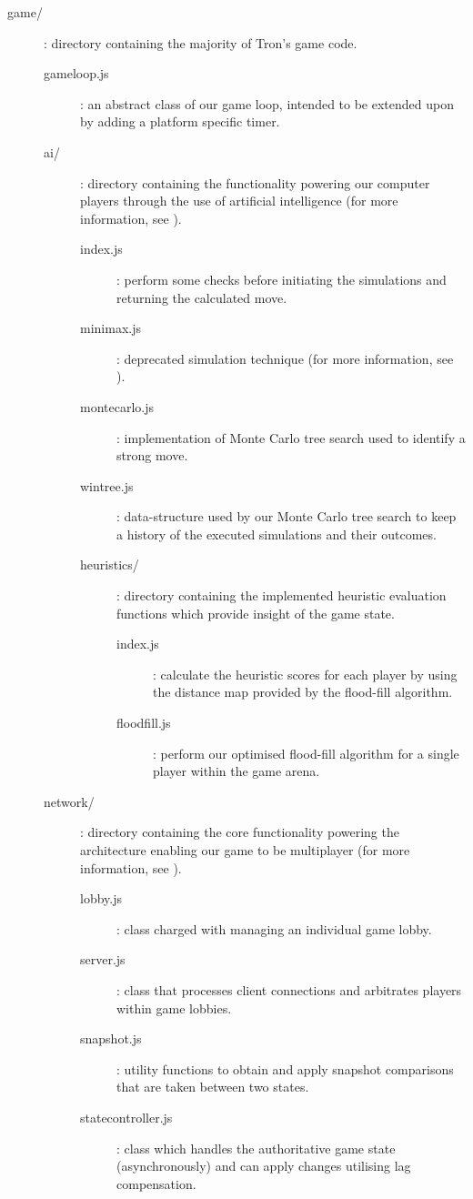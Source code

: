 \documentclass{standalone}
\begin{document}
\begin{formal}
\begin{description}
\begin{description}
				    \item[game/]: directory containing the majority of Tron's game code.
			      	\begin{description}
			      		\item[gameloop.js]: an abstract class of our game loop, intended to be extended upon by adding a platform specific timer.

			      		\item[ai/]: directory containing the functionality powering our computer players through the use of artificial intelligence (for more information, see ).
				      	\begin{description}
				      		\item[index.js]: perform some checks before initiating the simulations and returning the calculated move.
				      		\item[minimax.js]: deprecated simulation technique (for more information, see ).
				      		\item[montecarlo.js]: implementation of Monte Carlo tree search used to identify a strong move.
				      		\item[wintree.js]: data-structure used by our Monte Carlo tree search to keep a history of the executed simulations and their outcomes.

				      		\item[heuristics/]: directory containing the implemented heuristic evaluation functions which provide insight of the game state.
					      	\begin{description}
				      			\item[index.js]: calculate the heuristic scores for each player by using the distance map provided by the flood-fill algorithm.
				      			\item[floodfill.js]: perform our optimised flood-fill algorithm for a single player within the game arena.
					      	\end{description}
						\end{description}

					    \item[network/]: directory containing the core functionality powering the architecture enabling our game to be multiplayer (for more information, see ).
				      	\begin{description}
			      			\item[lobby.js]: class charged with managing an individual game lobby.
			      			\item[server.js]: class that processes client connections and arbitrates players within game lobbies.
			      			\item[snapshot.js]: utility functions to obtain and apply snapshot comparisons that are taken between two states.
			      			\item[statecontroller.js]: class which handles the authoritative game state (asynchronously) and can apply changes utilising lag compensation.


\end{description}
\end{description}
\end{description}
\end{description}
\end{formal}
\end{document}
